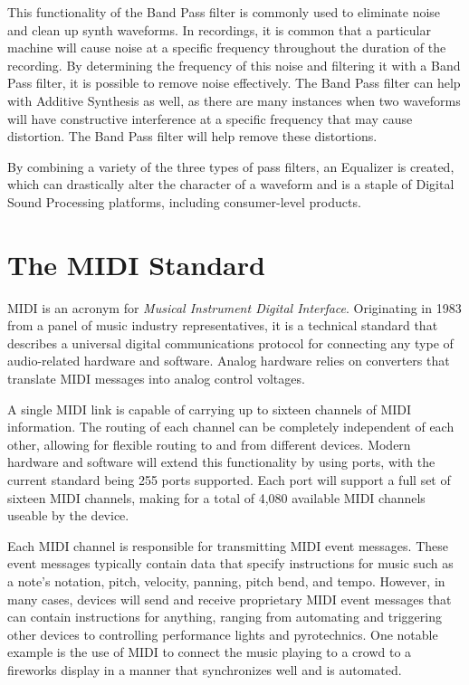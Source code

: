 \documentclass[a4paper,12pt]{report}
\begin{document}
This functionality of the Band Pass filter is commonly used to eliminate noise and clean up synth waveforms. In recordings, it is common that a particular machine will cause noise at a specific frequency throughout the duration of the recording. By determining the frequency of this noise and filtering it with a Band Pass filter, it is possible to remove noise effectively. The Band Pass filter can help with Additive Synthesis as well, as there are many instances when two waveforms will have constructive interference at a specific frequency that may cause distortion. The Band Pass filter will help remove these distortions.

By combining a variety of the three types of pass filters, an Equalizer is created, which can drastically alter the character of a waveform and is a staple of Digital Sound Processing platforms, including consumer-level products.


\section{The MIDI Standard}
\label{sec:midistandard}
MIDI is an acronym for \emph{Musical Instrument Digital Interface}. Originating in 1983 from a panel of music industry representatives, it is a technical standard that describes a universal digital communications protocol for connecting any type of audio-related hardware and software. Analog hardware relies on converters that translate MIDI messages into analog control voltages. 

A single MIDI link is capable of carrying up to sixteen channels of MIDI information. The routing of each channel can be completely independent of each other, allowing for flexible routing to and from different devices. Modern hardware and software will extend this functionality by using ports, with the current standard being 255 ports supported. Each port will support a full set of sixteen MIDI channels, making for a total of 4,080 available MIDI channels useable by the device.

Each MIDI channel is responsible for transmitting MIDI event messages. These event messages typically contain data that specify instructions for music such as a note's notation, pitch, velocity, panning, pitch bend, and tempo. However, in many cases, devices will send and receive proprietary MIDI event messages that can contain instructions for anything, ranging from automating and triggering other devices to controlling performance lights and pyrotechnics. One notable example is the use of MIDI to connect the music playing to a crowd to a fireworks display in a manner that synchronizes well and is automated.
\end{document}
